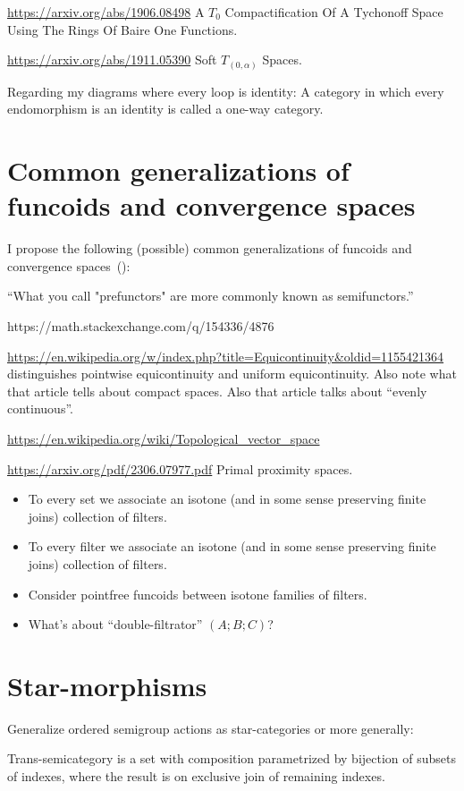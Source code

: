 \documentclass{amsart}
\begin{document}
\url{https://arxiv.org/abs/1906.08498} A $T_0$ Compactification Of A Tychonoff Space Using The Rings Of Baire One
  Functions.

\url{https://arxiv.org/abs/1911.05390} Soft $T_{(0,\alpha)}$ Spaces.

Regarding my diagrams where every loop is identity:
A category in which every endomorphism is an identity is called a one-way category.

\section{Common generalizations of funcoids and convergence spaces}

I propose the following (possible) common generalizations of funcoids and convergence spaces~(\cite{converg}):

``What you call "prefunctors" are more commonly known as semifunctors.''

https://math.stackexchange.com/q/154336/4876

\url{https://en.wikipedia.org/w/index.php?title=Equicontinuity&oldid=1155421364} distinguishes
pointwise equicontinuity and uniform equicontinuity. Also note what that article tells about compact spaces.
Also that article talks about ``evenly continuous''.

\url{https://en.wikipedia.org/wiki/Topological_vector_space}

\url{https://arxiv.org/pdf/2306.07977.pdf} Primal proximity spaces.

\begin{itemize}
\item To every set we associate an isotone (and in some sense preserving finite joins) collection of filters.
\item To every filter we associate an isotone (and in some sense preserving finite joins) collection of filters.
\item Consider pointfree funcoids between isotone families of filters.
\item What's about ``double-filtrator'' $(A;B;C)$?
\end{itemize}

\section{Star-morphisms}

Generalize ordered semigroup actions as star-categories or more generally:

Trans-semicategory is a set with composition parametrized by bijection of subsets of indexes, where the result is on exclusive join of remaining indexes.
\end{document}
